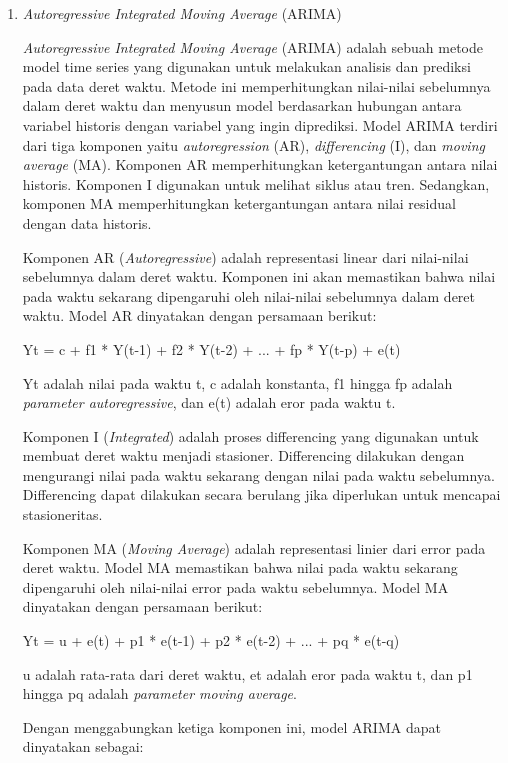 \begin{enumerate}
    \item \textit{Autoregressive Integrated Moving Average} (ARIMA)
    
    \textit{Autoregressive Integrated Moving Average} (ARIMA) adalah sebuah metode model time series yang digunakan untuk melakukan analisis dan prediksi pada data deret waktu. Metode ini memperhitungkan nilai-nilai sebelumnya dalam deret waktu dan menyusun model berdasarkan hubungan antara variabel historis dengan variabel yang ingin diprediksi. Model ARIMA terdiri dari tiga komponen yaitu \textit{autoregression} (AR), \textit{differencing} (I), dan \textit{moving average} (MA). Komponen AR memperhitungkan ketergantungan antara nilai historis. Komponen I digunakan untuk melihat siklus atau tren. Sedangkan, komponen MA memperhitungkan ketergantungan antara nilai residual dengan data historis.

    Komponen AR (\textit{Autoregressive}) adalah representasi linear dari nilai-nilai sebelumnya dalam deret waktu. Komponen ini akan memastikan bahwa nilai pada waktu sekarang dipengaruhi oleh nilai-nilai sebelumnya dalam deret waktu. Model AR dinyatakan dengan persamaan berikut:

    Yt = c + f1 * Y(t-1) + f2 * Y(t-2) + ... + fp * Y(t-p) + e(t)

    Yt adalah nilai pada waktu t, c adalah konstanta, f1 hingga fp adalah \textit{parameter autoregressive}, dan e(t) adalah eror pada waktu t.

    Komponen I (\textit{Integrated}) adalah proses differencing yang digunakan untuk membuat deret waktu menjadi stasioner. Differencing dilakukan dengan mengurangi nilai pada waktu sekarang dengan nilai pada waktu sebelumnya. Differencing dapat dilakukan secara berulang jika diperlukan untuk mencapai stasioneritas.

    Komponen MA (\textit{Moving Average}) adalah representasi linier dari error pada deret waktu. Model MA memastikan bahwa nilai pada waktu sekarang dipengaruhi oleh nilai-nilai error pada waktu sebelumnya. Model MA dinyatakan dengan persamaan berikut:

    Yt = u + e(t) + p1 * e(t-1) + p2 * e(t-2) + ... + pq * e(t-q)
    
    u adalah rata-rata dari deret waktu, et adalah eror pada waktu t, dan p1 hingga pq adalah \textit{parameter moving average}.

    Dengan menggabungkan ketiga komponen ini, model ARIMA dapat dinyatakan sebagai:


\end{enumerate}
